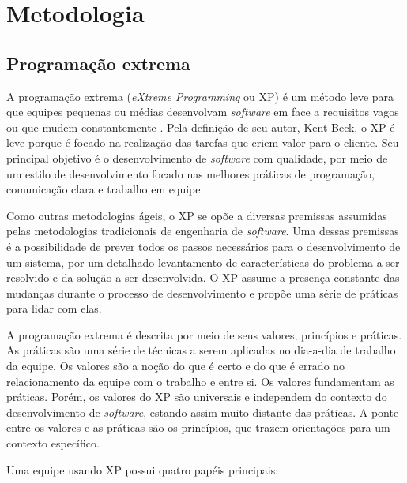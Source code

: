 
\chapter{Metodologia}

\section{Programação extrema}
  A programação extrema (\textit{eXtreme Programming} ou XP) é um método leve para que equipes pequenas ou médias desenvolvam \textit{software} em face a requisitos vagos ou que mudem constantemente \cite{beck04}. Pela definição de seu autor, Kent Beck, o XP é leve porque é focado na realização das tarefas que criem valor para o cliente. Seu principal objetivo é o desenvolvimento de \textit{software} com qualidade, por meio de um estilo de desenvolvimento focado nas melhores práticas de programação, comunicação clara e trabalho em equipe.

  Como outras metodologias ágeis, o XP se opõe a diversas premissas assumidas pelas metodologias tradicionais de engenharia de \textit{software}. Uma dessas premissas é a possibilidade de prever todos os passos necessários para o desenvolvimento de um sistema, por um detalhado levantamento de características do problema a ser resolvido e da solução a ser desenvolvida. O XP assume a presença constante das mudanças durante o processo de desenvolvimento e propõe uma série de práticas para lidar com elas.

  A programação extrema é descrita por meio de seus valores, princípios e práticas. As práticas são uma série de técnicas a serem aplicadas no dia-a-dia de trabalho da equipe. Os valores são a noção do que é certo e do que é errado no relacionamento da equipe com o trabalho e entre si. Os valores fundamentam as práticas. Porém, os valores do XP são universais e independem do contexto do desenvolvimento de \textit{software}, estando assim muito distante das práticas. A ponte entre os valores e as práticas são os princípios, que trazem orientações para um contexto específico.

Uma equipe usando XP possui quatro papéis principais:

